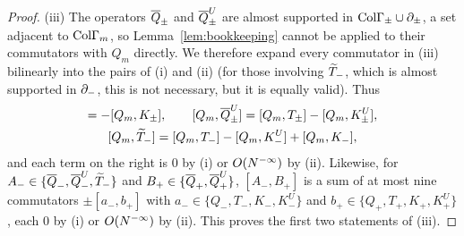 \begin{proof}
(iii) The operators $\overline{Q}_\pm$ and $\overline{Q}^U_\pm$ are almost supported in $\mathrm{Col}\Gamma_\pm\cup\partial_\pm$, a set adjacent to
$\mathrm{Col}\Gamma_{m}$, so Lemma~\ref{lem:bookkeeping} cannot be applied to their commutators with $Q_m$ directly. We therefore
expand every commutator in (iii) bilinearly into the pairs of (i) and (ii) (for those involving $\widetilde{T}_{-}$, which is almost
supported in $\partial_{-}$, this is not necessary, but it is equally valid). Thus
\begin{gather*}
[Q_m,\Qb_\pm]=-[Q_m,K_\pm],\qquad[Q_m,\Qb^U_\pm]=[Q_m,T_\pm]-[Q_m,K^U_\pm],\\
[Q_m,\Tt]=[Q_m,T_-]-[Q_m,K^U_-]+[Q_m,K_-],
\end{gather*}
and each term on the right is $0$ by (i) or $O(N^{-\infty})$ by (ii). Likewise, for $A_-\in\{\overline{Q}_-,\overline{Q}^U_-,\widetilde{T}_{-}\}$ and
$B_+\in\{\overline{Q}_+,\overline{Q}^U_+\}$, $[A_-,B_+]$ is a sum of at most nine commutators $\pm[a_-,b_+]$ with
$a_-\in\{Q_-,T_-,K_-,K^U_-\}$ and $b_+\in\{Q_+,T_+,K_+,K^U_+\}$, each $0$ by (i) or $O(N^{-\infty})$ by (ii). This proves the first two
statements of (iii).


\end{proof}
